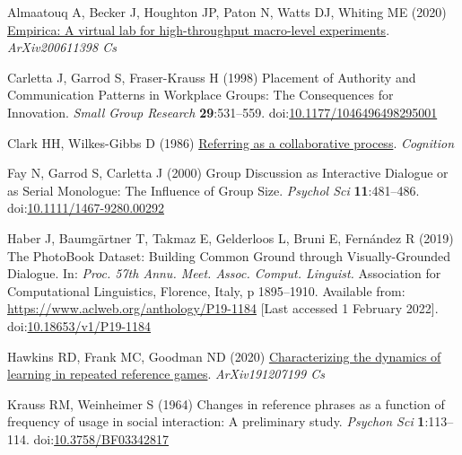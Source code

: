 \documentclass[
  english,
  a4paper,
]{article}
\newlength{\cslhangindent}
\newlength{\cslentryspacingunit} %
\newenvironment{CSLReferences}[2] %
 {%
  \setlength{\parindent}{0pt}
  \ifodd #1
  \let\oldpar\par
  \def\par{\hangindent=\cslhangindent\oldpar}
  \fi
  \setlength{\parskip}{#2\cslentryspacingunit}
 }%
 {}
\begin{document}
\hypertarget{refs}{}
\begin{CSLReferences}{1}{0}
\leavevmode{}%
Almaatouq A, Becker J, Houghton JP, Paton N, Watts DJ, Whiting ME (2020) \href{http://arxiv.org/abs/2006.11398}{Empirica: A virtual lab for high-throughput macro-level experiments}. \emph{ArXiv200611398 Cs}

\leavevmode{}%
Carletta J, Garrod S, Fraser-Krauss H (1998) Placement of {Authority} and {Communication Patterns} in {Workplace Groups}: {The Consequences} for {Innovation}. \emph{Small Group Research} \textbf{29}:531--559. doi:\href{https://doi.org/10.1177/1046496498295001}{10.1177/1046496498295001}

\leavevmode{}%
Clark HH, Wilkes-Gibbs D (1986) \href{http://www.speech.kth.se/~edlund/bielefeld/references/clark-and-wilkes-gibbs-1986.pdf}{Referring as a collaborative process}. \emph{Cognition}

\leavevmode{}%
Fay N, Garrod S, Carletta J (2000) Group {Discussion} as {Interactive Dialogue} or as {Serial Monologue}: {The Influence} of {Group Size}. \emph{Psychol Sci} \textbf{11}:481--486. doi:\href{https://doi.org/10.1111/1467-9280.00292}{10.1111/1467-9280.00292}

\leavevmode{}%
Haber J, Baumgärtner T, Takmaz E, Gelderloos L, Bruni E, Fernández R (2019) The {PhotoBook Dataset}: {Building Common Ground} through {Visually-Grounded Dialogue}. In: \emph{Proc. 57th {Annu}. {Meet}. {Assoc}. {Comput}. {Linguist}.} {Association for Computational Linguistics}, {Florence, Italy}, p 1895--1910. Available from: \url{https://www.aclweb.org/anthology/P19-1184} {[}Last accessed 1 February 2022{]}. doi:\href{https://doi.org/10.18653/v1/P19-1184}{10.18653/v1/P19-1184}

\leavevmode{}%
Hawkins RD, Frank MC, Goodman ND (2020) \href{http://arxiv.org/abs/1912.07199}{Characterizing the dynamics of learning in repeated reference games}. \emph{ArXiv191207199 Cs}

\leavevmode{}%
Krauss RM, Weinheimer S (1964) Changes in reference phrases as a function of frequency of usage in social interaction: A preliminary study. \emph{Psychon Sci} \textbf{1}:113--114. doi:\href{https://doi.org/10.3758/BF03342817}{10.3758/BF03342817}


\end{CSLReferences}
\end{document}
